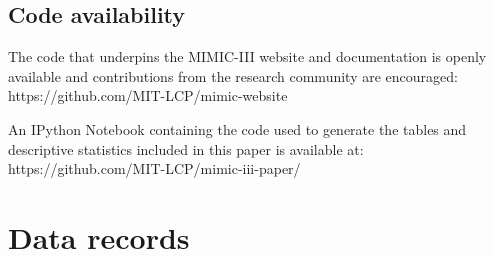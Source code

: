 \documentclass[english]{article}
\begin{document}
\subsection*{Code availability}




The code that underpins the MIMIC-III website and documentation is openly available and contributions from the research community are encouraged: \\ https://github.com/MIT-LCP/mimic-website

An IPython Notebook containing the code used to generate the tables and descriptive statistics included in this paper is available at: \\ https://github.com/MIT-LCP/mimic-iii-paper/


\section*{Data records}

\end{document}
